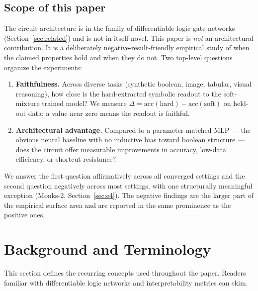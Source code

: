 \documentclass{article}
\begin{document}
\subsection{Scope of this paper}

The circuit architecture is in the family of differentiable logic gate networks (Section~\ref{sec:related}) and is not in itself novel.
This paper is \emph{not} an architectural contribution.
It is a deliberately negative-result-friendly empirical study of when the claimed properties hold and when they do not.
Two top-level questions organize the experiments:
\begin{enumerate}
  \item \textbf{Faithfulness.} Across diverse tasks (synthetic boolean, image, tabular, visual reasoning), how close is the hard-extracted symbolic readout to the soft-mixture trained model? We measure $\Delta = \mathrm{acc}(\text{hard}) - \mathrm{acc}(\text{soft})$ on held-out data; a value near zero means the readout is faithful.
  \item \textbf{Architectural advantage.} Compared to a parameter-matched MLP --- the obvious neural baseline with no inductive bias toward boolean structure --- does the circuit offer measurable improvements in accuracy, low-data efficiency, or shortcut resistance?
\end{enumerate}
We answer the first question affirmatively across all converged settings and the second question negatively across most settings, with one structurally meaningful exception (Monks-2, Section~\ref{sec:e4}).
The negative findings are the larger part of the empirical surface area and are reported in the same prominence as the positive ones.

\section{Background and Terminology}
\label{sec:background}

This section defines the recurring concepts used throughout the paper.
Readers familiar with differentiable logic networks and interpretability metrics can skim.
\end{document}
